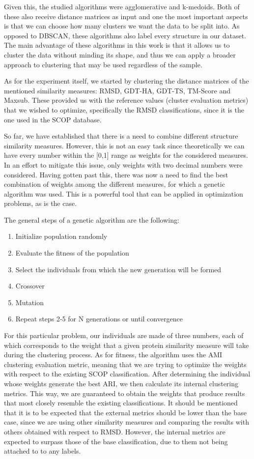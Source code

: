 Given this, the studied algorithms were agglomerative and k-medoids. Both of these also receive distance matrices as input and one the most important aspects is that we can choose how many clusters we want the data to be split into. As opposed to DBSCAN, these algorithms also label every structure in our dataset. The main advantage of these algorithms in this work is that it allows us to cluster the data without minding its shape, and thus we can apply a broader approach to clustering that may be used regardless of the sample.

As for the experiment itself, we started by clustering the distance matrices of the mentioned similarity measures: RMSD, GDT-HA, GDT-TS, TM-Score and Maxsub. These provided us with the reference values (cluster evaluation metrics) that we wished to optimize, specifically the RMSD classifications, since it is the one used in the SCOP database. 

So far, we have established that there is a need to combine different structure similarity measures. However, this is not an easy task since theoretically we can have every number within the [0,1] range as weights for the considered measures. In an effort to mitigate this issue, only weights with two decimal numbers were considered. Having gotten past this, there was now a need to find the best combination of weights among the different measures, for which a genetic algorithm was used. This is a powerful tool that can be applied in optimization problems, as is the case.

The general steps of a genetic algorithm are the following:
\begin{enumerate}
	\item Initialize population randomly
	\item Evaluate the fitness of the population
	\item Select the individuals from which the new generation will be formed
	\item Crossover
	\item Mutation
	\item Repeat steps 2-5 for N generations or until convergence
\end{enumerate}

For this particular problem, our individuals are made of three numbers, each of which corresponds to the weight that a given protein similarity measure will take during the clustering process. As for fitness, the algorithm uses the AMI clustering evaluation metric, meaning that we are trying to optimize the weights with respect to the existing SCOP classification. After determining the individual whose weights generate the best ARI, we then calculate its internal clustering metrics. This way, we are guaranteed to obtain the weights that produce results that most closely resemble the existing classifications. It should be mentioned that it is to be expected that the external metrics should be lower than the base case, since we are using other similarity measures and comparing the results with others obtained with respect to RMSD. However, the internal metrics are expected to surpass those of the base classification, due to them not being attached to to any labels.

